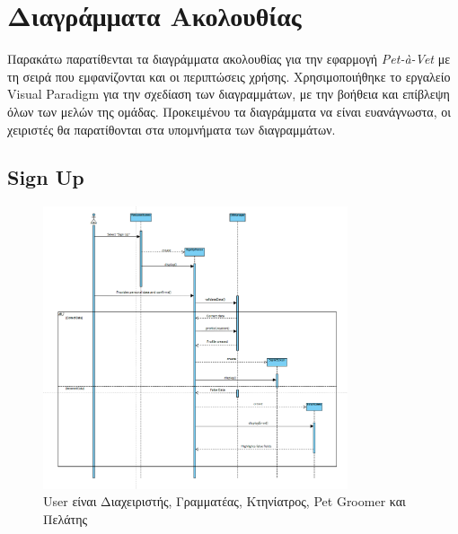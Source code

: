 \documentclass[12pt,a4paper,twoside]{book}
\begin{document}
\section{Διαγράμματα Ακολουθίας}

Παρακάτω παρατίθενται τα διαγράμματα ακολουθίας για την εφαρμογή \textit{Pet-à-Vet} με τη σειρά που εμφανίζονται και οι περιπτώσεις χρήσης. Χρησιμοποιήθηκε το εργαλείο Visual Paradigm για την σχεδίαση των διαγραμμάτων, με την βοήθεια και επίβλεψη όλων των μελών της ομάδας. Προκειμένου τα διαγράμματα να είναι ευανάγνωστα, οι χειριστές θα παρατίθονται στα υπομνήματα των διαγραμμάτων. %

\subsection{Sign Up}
\begin{figure}[H]
    \centering
    \includegraphics[width=0.8\textwidth]{Resources/Sequence Diagram/Sign_Up_SD.png}
    \caption{User είναι Διαχειριστής, Γραμματέας, Κτηνίατρος, Pet Groomer και Πελάτης}\label{fig:sequence-signup}
\end{figure}
\end{document}
